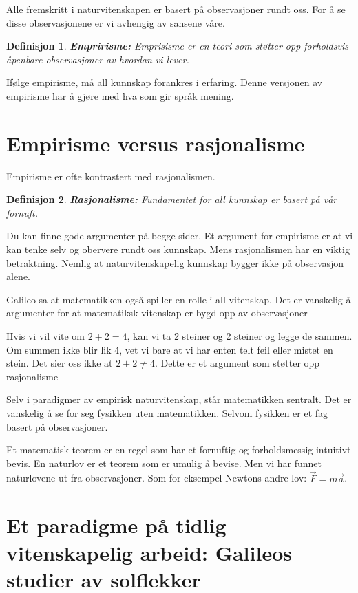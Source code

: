 \documentclass[11pt]{article}
\newtheorem{definition}{Definisjon}
\begin{document}
Alle fremskritt i naturvitenskapen er basert på observasjoner rundt oss. For å se disse observasjonene er vi avhengig av sansene våre.


\begin{definition}
    \textbf{Empririsme:} Emprisisme er en teori som støtter opp forholdsvis åpenbare observasjoner av hvordan vi lever.
\end{definition}


Ifølge empirisme, må all kunnskap forankres i erfaring. Denne versjonen av empirisme har å gjøre med hva som gir språk mening.


\section{Empirisme versus rasjonalisme}

Empirisme er ofte kontrastert med rasjonalismen.

\begin{definition}
    \textbf{Rasjonalisme:} Fundamentet for all kunnskap er basert på vår fornuft.
\end{definition}

Du kan finne gode argumenter på begge sider. Et argument for empirisme er at vi kan tenke selv og obervere rundt oss kunnskap. 
Mens rasjonalismen har en viktig betraktning. Nemlig at naturvitenskapelig kunnskap bygger ikke på observasjon alene. 

Galileo sa at matematikken også spiller en rolle i all vitenskap. Det er vanskelig å argumenter for at matematiksk vitenskap er bygd opp av observasjoner

Hvis vi vil vite om $2+2=4$, kan vi ta 2 steiner og 2 steiner og legge de sammen. Om summen ikke blir lik 4, vet vi bare at vi har enten telt feil eller mistet en stein. 
Det sier oss ikke at $2+2 \neq 4$. Dette er et argument som støtter opp rasjonalisme

Selv i paradigmer av empirisk naturvitenskap, står matematikken sentralt. Det er vanskelig å se for seg fysikken uten matematikken. Selvom fysikken er et fag basert på observasjoner.

Et matematisk teorem er en regel som har et fornuftig og forholdsmessig intuitivt bevis. En naturlov er et teorem som er umulig å bevise.
Men vi har funnet naturlovene ut fra observasjoner. Som for eksempel Newtons andre lov: $\vec{F} = m \vec{a}$.


\section{Et paradigme på tidlig vitenskapelig arbeid: Galileos studier av solflekker}
\end{document}
